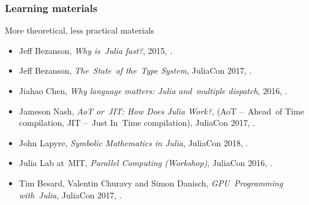 \documentclass{beamer}  %
\begin{document}
\begin{frame}
  \frametitle{Learning materials}

  \begin{block}{More theoretical, less practical materials}
    \begin{itemize}
    \item Jeff Bezanson, \emph{Why is~Julia fast?}, 2015,
      .
    \item Jeff Bezanson, \emph{The~State~of the~Type System}, JuliaCon
      2017, .
    \item Jiahao Chen, \emph{Why language matters: Julia and~multiple
        dispatch}, 2016,
      .
    \item Jameson Nash, \emph{AoT or~JIT: How Does Julia Work?}, (AoT
      --~Ahead~of Time compilation, JIT --~Just In~Time compilation),
      JuliaCon 2017,
      .
    \item John Lapyre, \emph{Symbolic Mathematics in Julia}, JuliaCon
      2018, .
    \item Julia Lab at~MIT, \emph{Parallel Computing (Workshop)},
      JuliaCon 2016,
      .
    \item Tim Besard, Valentin Churavy and Simon Danisch,
      \emph{GPU~Programming with~Julia}, JuliaCon 2017,
      .
    \end{itemize}
  \end{block}

\end{frame}
\end{document}

